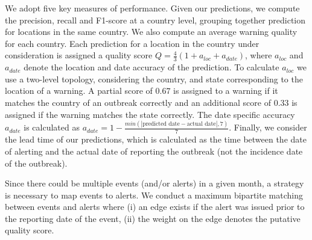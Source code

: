 \documentclass[conference]{IEEEtran}
\begin{document}
 We adopt five key measures of performance. Given our predictions, we compute the precision, recall and F1-score at a country level, grouping together prediction for locations in the same country. We also compute an average warning quality for each country. Each prediction for a location in the country under consideration is assigned a quality score $Q = \frac{4}{3}(1 + a_{loc} + a_{date})$, where $a_{loc}$ and $a_{date}$ denote the location and date accuracy of the prediction. To calculate $a_{loc}$ we use a two-level topology, considering the country, and state corresponding to the location of a warning. A partial score of $0.67$ is assigned to a warning if it matches the country of an outbreak correctly and an additional score of $0.33$ is assigned if the warning matches the state correctly. The date specific accuracy $a_{date}$ is calculated as $a_{date} = 1 - \frac{min(|\mbox{predicted date} - \mbox{actual date}|,7)}{7}$. Finally, we consider the lead time of our predictions, which is calculated as the time between the date of alerting and the actual date of reporting the outbreak (not the incidence date of the outbreak). 

 Since there could be multiple events (and/or alerts) in a given month, a strategy is necessary to map events to alerts. We conduct a maximum bipartite matching between events and alerts where (i) an edge exists if the alert was issued prior to the reporting date of the event, (ii) the weight on the edge denotes the putative quality score. 
\end{document}
